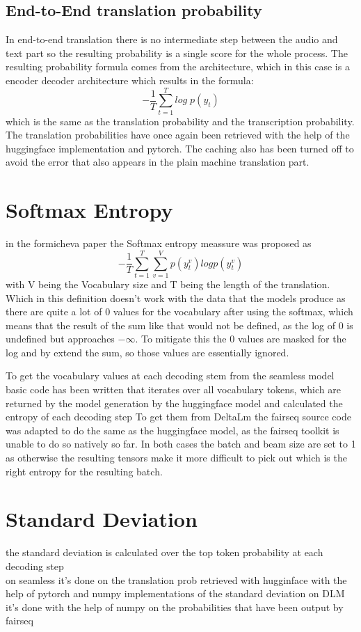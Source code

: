 \subsection{End-to-End translation probability}
In end-to-end translation there is no intermediate step between the audio and text part so the resulting probability is a single score for the whole process.
The resulting probability formula comes from the architecture, which in this case is a encoder decoder architecture which results in the formula: $$-\frac{1}{T}\sum_{t=1}^T log\; p(y_t)$$ which is the same as the translation probability and the transcription probability.
The translation probabilities have once again been retrieved with the help of the huggingface implementation and pytorch. 
The caching also has been turned off to avoid the error that also appears in the plain machine translation part. 

\section{Softmax Entropy}
in the formicheva \cite{fomicheva2020unsupervised} paper the Softmax entropy meassure was proposed as $$-\frac{1}{T}\sum_{t=1}^T\sum_{v=1}^Vp(y_t^v)logp(y_t^v)$$ with V being the Vocabulary size and T being the length of the translation. Which in this definition doesn't work with the data that the models produce as there are quite a lot of 0 values for the vocabulary after using the softmax, which means that the result of the sum like that would not be defined, as the log of 0 is undefined but approaches $-\infty$. To mitigate this the 0 values are masked for the log and by extend the sum, so those values are essentially ignored. 

To get the vocabulary values at each decoding stem from the seamless model basic code has been written that iterates over all vocabulary tokens, which are returned by the model generation by the huggingface model and calculated the entropy of each decoding step
To get them from DeltaLm the fairseq source code was adapted to do the same as the huggingface model, as the fairseq toolkit is unable to do so natively so far. 
In both cases the batch and beam size are set to 1 as otherwise the resulting tensors make it more difficult to pick out which is the right entropy for the resulting batch. 

\section{Standard Deviation}
the standard deviation is calculated over the top token probability at each decoding step\\
on seamless it's done on the translation prob retrieved with hugginface with the help of pytorch and numpy implementations of the standard deviation
on DLM it's done with the help of numpy on the probabilities that have been output by fairseq


